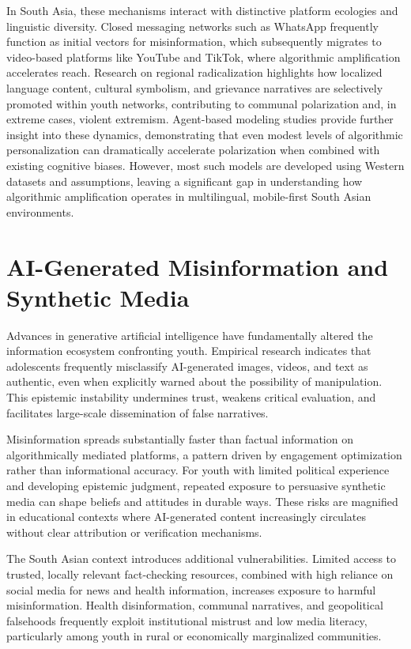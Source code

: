 \documentclass[12pt,a4paper]{report}
\begin{document}
In South Asia, these mechanisms interact with distinctive platform ecologies and linguistic diversity. Closed messaging networks such as WhatsApp frequently function as initial vectors for misinformation, which subsequently migrates to video-based platforms like YouTube and TikTok, where algorithmic amplification accelerates reach. Research on regional radicalization highlights how localized language content, cultural symbolism, and grievance narratives are selectively promoted within youth networks, contributing to communal polarization and, in extreme cases, violent extremism.
\newpage
Agent-based modeling studies provide further insight into these dynamics, demonstrating that even modest levels of algorithmic personalization can dramatically accelerate polarization when combined with existing cognitive biases. However, most such models are developed using Western datasets and assumptions, leaving a significant gap in understanding how algorithmic amplification operates in multilingual, mobile-first South Asian environments.

\section{AI-Generated Misinformation and Synthetic Media}

Advances in generative artificial intelligence have fundamentally altered the information ecosystem confronting youth. Empirical research indicates that adolescents frequently misclassify AI-generated images, videos, and text as authentic, even when explicitly warned about the possibility of manipulation. This epistemic instability undermines trust, weakens critical evaluation, and facilitates large-scale dissemination of false narratives.

Misinformation spreads substantially faster than factual information on algorithmically mediated platforms, a pattern driven by engagement optimization rather than informational accuracy. For youth with limited political experience and developing epistemic judgment, repeated exposure to persuasive synthetic media can shape beliefs and attitudes in durable ways. These risks are magnified in educational contexts where AI-generated content increasingly circulates without clear attribution or verification mechanisms.

The South Asian context introduces additional vulnerabilities. Limited access to trusted, locally relevant fact-checking resources, combined with high reliance on social media for news and health information, increases exposure to harmful misinformation. Health disinformation, communal narratives, and geopolitical falsehoods frequently exploit institutional mistrust and low media literacy, particularly among youth in rural or economically marginalized communities.
\end{document}
